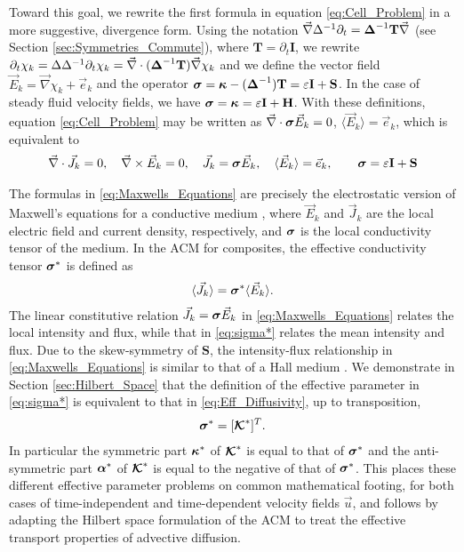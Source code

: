 \documentclass[11pt]{amsart}
\newcommand{\Tb}{\mathbf{T}}
\newcommand{\Hb}{\mathbf{H}}
\newcommand{\Ib}{\mathbf{I}}
\newcommand{\Sb}{\mathbf{S}}
\newcommand\Kbc{\mbox{\boldmath${\mathcal{K}}$}}
\newcommand\bsig{\mbox{\boldmath${\sigma}$}}
\newcommand\balpha{\mbox{\boldmath${\alpha}$}}
\newcommand\bDelta{\mbox{\boldmath${\Delta}$}}
\newcommand\bkappa{\mbox{\boldmath${\kappa}$}}
\begin{document}
Toward this goal, we rewrite the first formula in equation
\eqref{eq:Cell_Problem} in a more suggestive, divergence
form. Using the notation $\vec{\nabla}\Delta^{-1}\partial_t=\bDelta^{-1}\Tb\vec{\nabla}$
(see Section \ref{sec:Symmetries_Commute}), where $\Tb=\partial_t\Ib$,  we
rewrite \cite{Fannjiang:SIAM_JAM:333}
$\partial_t\chi_k=\Delta\Delta^{-1}\partial_t\chi_k=\vec{\nabla}\cdot(\bDelta^{-1}\Tb)\vec{\nabla}\chi_k$ and we
define the vector field $\vec{E}_k=\vec{\nabla}\chi_k+\vec{e}_k$ and the
operator $\bsig=\bkappa-(\bDelta^{-1})\Tb=\varepsilon\Ib+\Sb$.  In the case of steady
fluid velocity fields, we have $\bsig=\bkappa=\varepsilon\Ib+\Hb$. With these
definitions, equation \eqref{eq:Cell_Problem} may be written as 
$\vec{\nabla}\cdot\bsig\vec{E}_k=0$, $\langle\vec{E}_k\rangle=\vec{e}_k$, which is
equivalent to    
%
\begin{align}\label{eq:Maxwells_Equations}    
  \vec{\nabla}\cdot\vec{J}_k=0, \quad
  \vec{\nabla}\times\vec{E}_k=0, \quad
  \vec{J}_k=\bsig\vec{E}_k,\quad
  \langle\vec{E}_k\rangle=\vec{e}_k,\qquad
  \bsig%
       =\varepsilon\Ib+\Sb
\end{align}
%




The formulas in \eqref{eq:Maxwells_Equations} are precisely the
electrostatic version of Maxwell's equations for a conductive medium
\cite{Golden:CMP-473}, where $\vec{E}_k$ and $\vec{J}_k$ are the local
electric field and current density, respectively, and $\bsig$ is the
local conductivity tensor of the medium. In the ACM for composites,
the effective conductivity tensor $\bsig^*$ is defined as
% 
\begin{align}\label{eq:sigma*}
  \langle\vec{J}_k\rangle=\bsig^*\langle\vec{E}_k\rangle.
\end{align}
%
The linear constitutive relation $\vec{J}_k=\bsig\vec{E}_k$ in
\eqref{eq:Maxwells_Equations} relates the local intensity and flux,
while that in \eqref{eq:sigma*} relates the mean intensity and
flux. Due to the skew-symmetry of $\Sb$, the intensity-flux
relationship in \eqref{eq:Maxwells_Equations} is similar to that of a
Hall medium \cite{Isichenko:JNS:1991:375}. We demonstrate in Section
\ref{sec:Hilbert_Space} that the definition of the effective parameter
in \eqref{eq:sigma*} is equivalent to that in
\eqref{eq:Eff_Diffusivity}, up to transposition,
%
\begin{align}\label{eq:Eff_Equiv}
  \bsig^*=[\Kbc^*]^T.
\end{align}
%
In particular the symmetric part $\bkappa^*$ of $\Kbc^*$ is equal to
that of $\bsig^*$ and the anti-symmetric part $\balpha^*$ of $\Kbc^*$
is equal to the negative of that of $\bsig^*$. This places these
different effective parameter problems on common mathematical footing,
for both cases of time-independent and time-dependent velocity fields
$\vec{u}$, and follows by adapting the Hilbert space formulation of
the ACM to treat the effective transport properties of advective
diffusion.          
\end{document}
